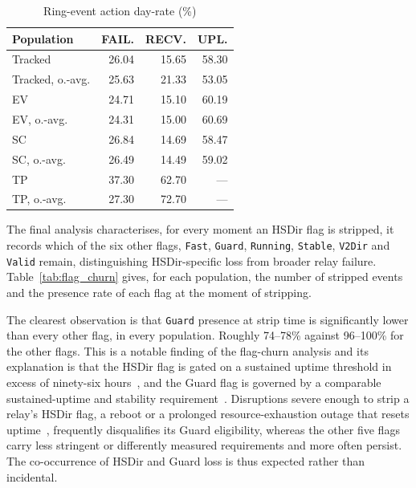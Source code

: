 \documentclass[conference]{IEEEtran}
\begin{document}
\begin{table}[htbp]
\caption{Ring-event action day-rate (\%)}
\begin{center}
\begin{tabular}{|l|r|r|r|}
\hline
\textbf{Population} & \textbf{FAIL.} & \textbf{RECV.} & \textbf{UPL.} \\
\hline
Tracked & 26.04 & 15.65 & 58.30 \\
\hline
Tracked, o.-avg. & 25.63 & 21.33 & 53.05 \\
\hline
EV & 24.71 & 15.10 & 60.19 \\
\hline
EV, o.-avg. & 24.31 & 15.00 & 60.69 \\
\hline
SC & 26.84 & 14.69 & 58.47 \\
\hline
SC, o.-avg. & 26.49 & 14.49 & 59.02 \\
\hline
TP & 37.30 & 62.70 & --- \\
\hline
TP, o.-avg. & 27.30 & 72.70 & --- \\
\hline
\end{tabular}
\label{tab:action_d_rates}
\end{center}
\end{table}
 
The final analysis characterises, for every moment an HSDir flag is stripped, it records which of the six other flags, \texttt{Fast}, \texttt{Guard}, \texttt{Running}, \texttt{Stable}, \texttt{V2Dir} and 
\texttt{Valid} remain, distinguishing HSDir-specific loss from broader relay failure. Table~\ref{tab:flag_churn} gives, for each population, the number of stripped events and the presence 
rate of each flag at the moment of stripping.
 
The clearest observation is that \texttt{Guard} presence at strip time is significantly lower than every other flag, in every population. Roughly 74--78\% 
against 96--100\% for the other flags. This is a notable finding of the flag-churn analysis and its explanation is that the HSDir flag is 
gated on a sustained uptime threshold in excess of ninety-six hours~\cite{winter2016sybil}, and the Guard flag is governed by a comparable 
sustained-uptime and stability requirement~\cite{tor_dirspec}. Disruptions severe enough to strip a relay's HSDir flag, a reboot or a prolonged resource-exhaustion outage 
that resets uptime~\cite{hoeller2024ddos}, frequently disqualifies its Guard eligibility, whereas the other five flags carry less stringent or differently 
measured requirements and more often persist. The co-occurrence of HSDir and Guard loss is thus expected rather than incidental.
\end{document}
